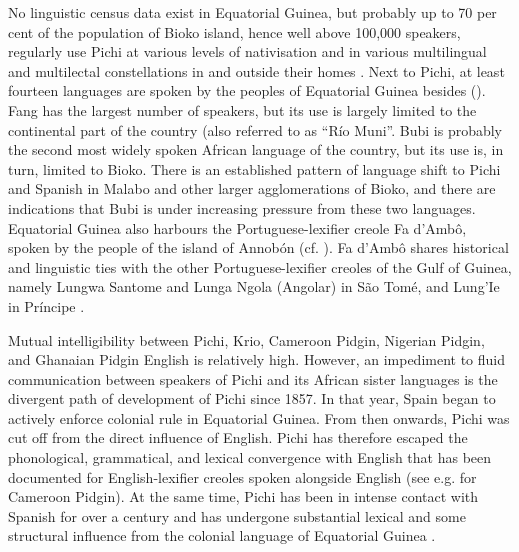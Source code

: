 No linguistic census data exist in Equatorial Guinea, but probably up to 70 per cent of the population of Bioko island, hence well above 100,000 speakers, regularly use Pichi at various levels of nativisation and in various multilingual and multilectal constellations in and outside their homes \citep[194]{Yakpo2013}. Next to Pichi, at least fourteen languages are spoken by the peoples of Equatorial Guinea besides (\citealt{Hammarstrom2017}). Fang has the largest number of speakers, but its use is largely limited to the continental part of the country (also referred to as “Río Muni”\textstyleannotationreference{)}. Bubi is probably the second most widely spoken African language of the country, but its use is, in turn, limited to Bioko. There is an established pattern of language shift to Pichi and Spanish in Malabo and other larger agglomerations of Bioko, and there are indications that Bubi is under increasing pressure from these two languages. Equatorial Guinea also harbours the Portuguese-lexifier creole Fa d’Ambô, spoken by the people of the island of Annobón (cf. ). Fa d’Ambô shares historical and linguistic ties with the other Portuguese-lexifier creoles of the Gulf of Guinea, namely Lungwa Santome and Lunga Ngola (Angolar) in São Tomé, and Lung’Ie in Príncipe \citep{Post2013}. 



Mutual intelligibility between Pichi, Krio, Cameroon Pidgin, Nigerian Pidgin, and Ghanaian Pidgin English is relatively high. However, an impediment to fluid communication between speakers of Pichi and its African sister languages is the divergent path of development of Pichi since 1857. In that year, Spain began to actively enforce colonial rule in Equatorial Guinea. From then onwards, Pichi was cut off from the direct influence of English. Pichi has therefore escaped the phonological, grammatical, and lexical convergence with English that has been documented for English-lexifier creoles spoken alongside English (see e.g. \citealt{SalaNgefac2006} for Cameroon Pidgin). At the same time, Pichi has been in intense contact with Spanish for over a century and has undergone substantial lexical and some structural influence from the colonial language of Equatorial Guinea . 



